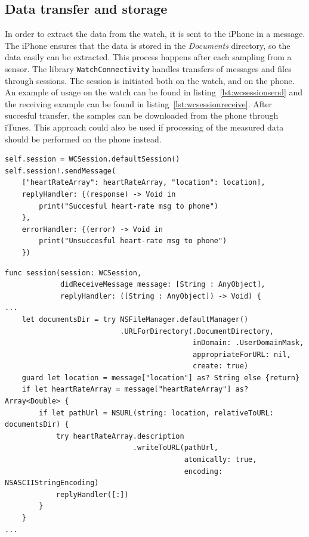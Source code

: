 \subsection{Data transfer and storage}
In order to extract the data from the watch, it is sent to the iPhone in a
message. The iPhone ensures that the data is stored in the \textit{Documents}
directory, so the data easily can be extracted. This process happens after each
sampling from a sensor. The library \texttt{WatchConnectivity} handles transfers
of messages and files through sessions. The session is initiated both on the
watch, and on the phone. An example of usage on the watch can be found in 
listing~\ref{lst:wcsessionsend} and the receiving example can be found in 
listing~\ref{lst:wcsessionreceive}.
After succesful transfer, the samples can be downloaded from the phone through
iTunes.
This approach could also be used if processing of the measured data should be
performed on the phone instead.

\begin{lstlisting}[label={lst:wcsessionsend},caption={Send heart rate data to the
phone from the watch.}]
self.session = WCSession.defaultSession()
self.session!.sendMessage(
    ["heartRateArray": heartRateArray, "location": location],
    replyHandler: {(response) -> Void in
        print("Succesful heart-rate msg to phone")
    },
    errorHandler: {(error) -> Void in
        print("Unsuccesful heart-rate msg to phone")
    })
\end{lstlisting}

\begin{lstlisting}[label={lst:wcsessionreceive},caption={Receiving heart rate
data on phone, and storing it to the Documents folder.}]
func session(session: WCSession, 
             didReceiveMessage message: [String : AnyObject], 
             replyHandler: ([String : AnyObject]) -> Void) {
...
    let documentsDir = try NSFileManager.defaultManager()
                           .URLForDirectory(.DocumentDirectory, 
                                            inDomain: .UserDomainMask,
                                            appropriateForURL: nil, 
                                            create: true)
    guard let location = message["location"] as? String else {return}
    if let heartRateArray = message["heartRateArray"] as? Array<Double> {
        if let pathUrl = NSURL(string: location, relativeToURL: documentsDir) {
            try heartRateArray.description
                              .writeToURL(pathUrl, 
                                          atomically: true, 
                                          encoding: NSASCIIStringEncoding)
            replyHandler([:])
        }
    }
...
\end{lstlisting}
